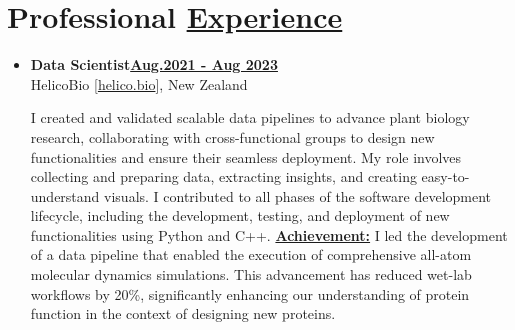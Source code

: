 
\section{Professional \href{.}{Experience}}

\begin{itemize}[leftmargin=5mm]


    \item \textbf{\large Data Scientist}\hfill \href{.}{\bf Aug.2021 - Aug 2023}\\
          HelicoBio [\href{www.helico.bio}{helico.bio}],
          New Zealand

              {\noindent
                  I created and validated scalable data pipelines to advance plant biology research, collaborating with cross-functional groups to design new functionalities and ensure their seamless deployment.
                  My role involves collecting and preparing data, extracting insights, and creating easy-to-understand visuals. I contributed to all phases of the software development lifecycle, including the development, testing, and deployment of new functionalities using Python and C++.
                  \textbf{\href{.}{Achievement:}} I led the development of a data pipeline that enabled the execution of comprehensive all-atom molecular dynamics simulations. This advancement has reduced wet-lab workflows by 20\%, significantly enhancing our understanding of protein function in the context of designing new proteins.

              }


\end{itemize}
